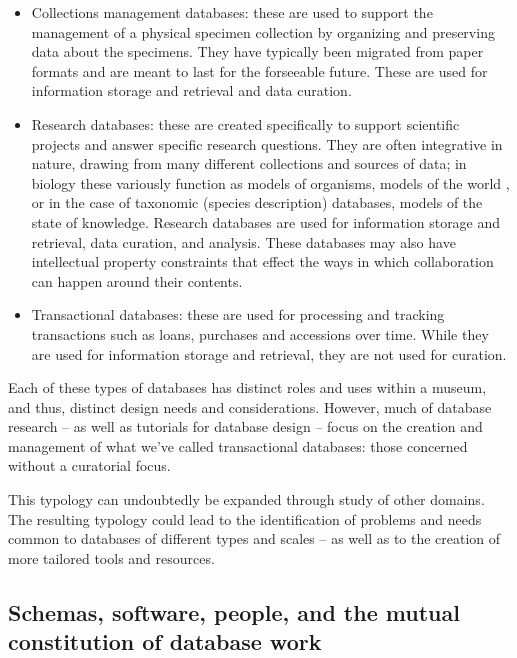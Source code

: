 \begin{itemize}
\item Collections management databases: these are used to support the management of a physical specimen collection by organizing and preserving data about the specimens. They have typically been migrated from paper formats and are meant to last for the forseeable future. These are used for information storage and retrieval and data curation.
\item Research databases: these are created specifically to support scientific projects and answer specific research questions. They are often integrative in nature, drawing from many different collections and sources of data; in biology these variously function as models of organisms\cite{Hine_2006}, models of the world \cite{Bowker_2000}, or in the case of taxonomic (species description) databases, models of the state of knowledge. Research databases are used for information storage and retrieval, data curation, and analysis. These databases may also have intellectual property constraints that effect the ways in which collaboration can happen around their contents. 
\item Transactional databases: these are used for processing and tracking transactions such as loans, purchases and accessions over time. While they are used for information storage and retrieval, they are not used for curation.
\end{itemize}

Each of these types of databases has distinct roles and uses within a museum, and thus, distinct design needs and considerations. However, much of database research -- as well as tutorials for database design -- focus on the creation and management of what we've called transactional databases: those concerned without a curatorial focus. 

This typology can undoubtedly be expanded through study of other domains. The resulting typology could lead to the identification of problems and needs common to databases of different types and scales -- as well as to the creation of more tailored tools and resources.

\subsection{Schemas, software, people, and the mutual constitution of database work}

